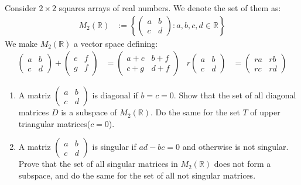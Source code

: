 \documentclass{tufte-handout}
\begin{document}
\begin{problem}
	Consider $2 \times 2$ squares arrays of real numbers. We denote the set of them as:
	\begin{align*}
		M_2(\mathbb{R}) &:= \left\{\begin{pmatrix}a & b\\ c & d \end{pmatrix}: a, b, c, d \in \mathbb{R}\right\}
	\end{align*}
	We make $M_2(\mathbb{R})$ a vector space defining:
	\begin{align*}
		\begin{pmatrix}
			a & b\\ c& d
		\end{pmatrix} + \begin{pmatrix}
			e & f\\ g& f
		\end{pmatrix} &= \begin{pmatrix}
			a+e & b+f\\ c+g & d+f
		\end{pmatrix} & r \begin{pmatrix}
			a & b\\ c&d
		\end{pmatrix} &= \begin{pmatrix}
			ra & rb\\ rc& rd
		\end{pmatrix}
	\end{align*}
	\begin{enumerate}
		\item A matriz $\begin{pmatrix}
			a & b\\ c& d
		\end{pmatrix}$ is diagonal if $b = c = 0$. Show that the set of all diagonal matrices $D$ is a subspace of $M_2(\mathbb{R})$. Do the same for the set $T$ of upper triangular matrices($c = 0$).
		\item A matriz $\begin{pmatrix}
			a & b\\ c& d
		\end{pmatrix}$ is singular if $ad - bc = 0$ and otherwise is not singular. Prove that the set of all singular matrices in $M_2(\mathbb{R})$ does not form a subspace, and do the same for the set of all not singular matrices.
	\end{enumerate}
\end{problem}
\end{document}

